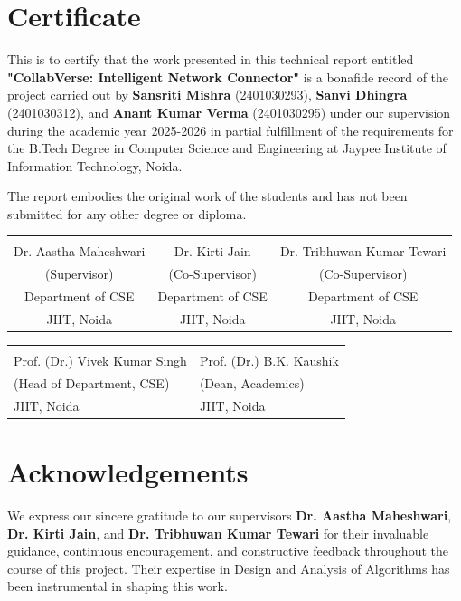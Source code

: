 \documentclass[12pt,a4paper]{article}
\begin{document}
\newpage
\section*{Certificate}
\vspace{0.5cm}

This is to certify that the work presented in this technical report entitled \textbf{"CollabVerse: Intelligent Network Connector"} is a bonafide record of the project carried out by \textbf{Sansriti Mishra} (2401030293), \textbf{Sanvi Dhingra} (2401030312), and \textbf{Anant Kumar Verma} (2401030295) under our supervision during the academic year 2025-2026 in partial fulfillment of the requirements for the B.Tech Degree in Computer Science and Engineering at Jaypee Institute of Information Technology, Noida.

The report embodies the original work of the students and has not been submitted for any other degree or diploma.

\vspace{1.5cm}
\begin{tabular}{ccc}
\hrulefill & \hrulefill & \hrulefill \\
Dr. Aastha Maheshwari & Dr. Kirti Jain & Dr. Tribhuwan Kumar Tewari \\
(Supervisor) & (Co-Supervisor) & (Co-Supervisor) \\
Department of CSE & Department of CSE & Department of CSE \\
JIIT, Noida & JIIT, Noida & JIIT, Noida
\end{tabular}

\vspace{1cm}
\begin{tabular}{p{6cm} p{6cm}}
\hrulefill & \hrulefill \\
Prof. (Dr.) Vivek Kumar Singh & Prof. (Dr.) B.K. Kaushik \\
(Head of Department, CSE) & (Dean, Academics) \\
JIIT, Noida & JIIT, Noida
\end{tabular}

\newpage
\section*{Acknowledgements}

We express our sincere gratitude to our supervisors \textbf{Dr. Aastha Maheshwari}, \textbf{Dr. Kirti Jain}, and \textbf{Dr. Tribhuwan Kumar Tewari} for their invaluable guidance, continuous encouragement, and constructive feedback throughout the course of this project. Their expertise in Design and Analysis of Algorithms has been instrumental in shaping this work.
\end{document}
